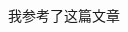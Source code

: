 \documentclass{usc-cs}
\begin{document}
	
	\cover
	\begin{spacing}{1}
		\tableofcontents
	\end{spacing}
	
	\newpage
	
	
	
	

	我参考了这篇文章\cite{girshick2014rich}	
	
	
		
\end{document}
